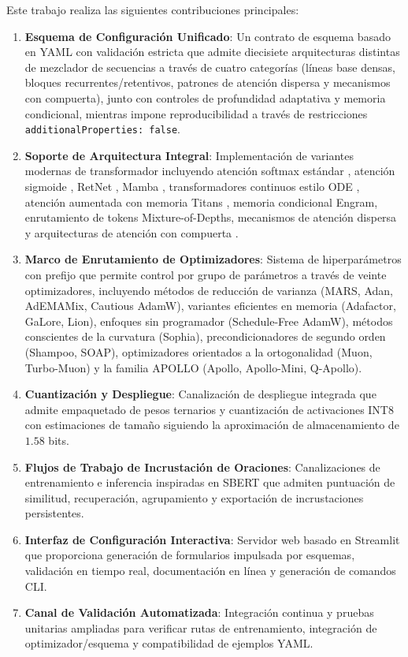 \documentclass[11pt,a4paper]{article}
\begin{document}
Este trabajo realiza las siguientes contribuciones principales:
\begin{enumerate}[leftmargin=*]
    \item \textbf{Esquema de Configuración Unificado}: Un contrato de esquema basado en YAML con validación estricta que admite diecisiete arquitecturas distintas de mezclador de secuencias a través de cuatro categorías (líneas base densas, bloques recurrentes/retentivos, patrones de atención dispersa y mecanismos con compuerta), junto con controles de profundidad adaptativa y memoria condicional, mientras impone reproducibilidad a través de restricciones \texttt{additionalProperties: false}.
    \item \textbf{Soporte de Arquitectura Integral}: Implementación de variantes modernas de transformador incluyendo atención softmax estándar \citep{vaswani_attention_2017}, atención sigmoide \citep{ramapuram_theory_2024}, RetNet \citep{sun_retentive_2023}, Mamba \citep{gu_mamba_2023}, transformadores continuos estilo ODE \citep{zhang_continuous_2021}, atención aumentada con memoria Titans \citep{behrouz_titans_2025}, memoria condicional Engram, enrutamiento de tokens Mixture-of-Depths, mecanismos de atención dispersa \citep{child_sparse_transformer_2019,beltagy_longformer_2020,zaheer_bigbird_2020,lou_sparsek_2024,yuan_nsa_2025,zhang_spargeattn_2025,wang_fasa_2026} y arquitecturas de atención con compuerta \citep{yang_gla_2023,yang_deltanet_2024,yang_gated_deltanet_2024,qin_hgrn2_2024,lin_forgetting_transformer_2025,qiu_gated_attention_2025}.
    \item \textbf{Marco de Enrutamiento de Optimizadores}: Sistema de hiperparámetros con prefijo que permite control por grupo de parámetros a través de veinte optimizadores, incluyendo métodos de reducción de varianza (MARS, Adan, AdEMAMix, Cautious AdamW), variantes eficientes en memoria (Adafactor, GaLore, Lion), enfoques sin programador (Schedule-Free AdamW), métodos conscientes de la curvatura (Sophia), precondicionadores de segundo orden (Shampoo, SOAP), optimizadores orientados a la ortogonalidad (Muon, Turbo-Muon) y la familia APOLLO (Apollo, Apollo-Mini, Q-Apollo).
    \item \textbf{Cuantización y Despliegue}: Canalización de despliegue integrada que admite empaquetado de pesos ternarios y cuantización de activaciones INT8 con estimaciones de tamaño siguiendo la aproximación de almacenamiento de $1.58$ bits.
    \item \textbf{Flujos de Trabajo de Incrustación de Oraciones}: Canalizaciones de entrenamiento e inferencia inspiradas en SBERT que admiten puntuación de similitud, recuperación, agrupamiento y exportación de incrustaciones persistentes.
    \item \textbf{Interfaz de Configuración Interactiva}: Servidor web basado en Streamlit que proporciona generación de formularios impulsada por esquemas, validación en tiempo real, documentación en línea y generación de comandos CLI.
    \item \textbf{Canal de Validación Automatizada}: Integración continua y pruebas unitarias ampliadas para verificar rutas de entrenamiento, integración de optimizador/esquema y compatibilidad de ejemplos YAML.
\end{enumerate}
\end{document}
